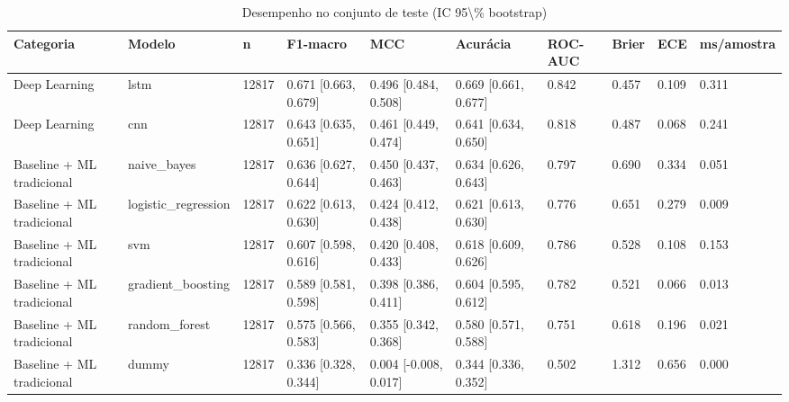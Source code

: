 \begin{table}[ht]
\centering
\caption{Desempenho no conjunto de teste (IC 95\textbackslash{}\% bootstrap)}
\label{tab:resultados}
\begin{tabular}{llllllllll}
\toprule
Categoria & Modelo & n & F1-macro & MCC & Acurácia & ROC-AUC & Brier & ECE & ms/amostra \\
\midrule
Deep Learning & lstm & 12817 & 0.671 [0.663, 0.679] & 0.496 [0.484, 0.508] & 0.669 [0.661, 0.677] & 0.842 & 0.457 & 0.109 & 0.311 \\
Deep Learning & cnn & 12817 & 0.643 [0.635, 0.651] & 0.461 [0.449, 0.474] & 0.641 [0.634, 0.650] & 0.818 & 0.487 & 0.068 & 0.241 \\
Baseline + ML tradicional & naive\_bayes & 12817 & 0.636 [0.627, 0.644] & 0.450 [0.437, 0.463] & 0.634 [0.626, 0.643] & 0.797 & 0.690 & 0.334 & 0.051 \\
Baseline + ML tradicional & logistic\_regression & 12817 & 0.622 [0.613, 0.630] & 0.424 [0.412, 0.438] & 0.621 [0.613, 0.630] & 0.776 & 0.651 & 0.279 & 0.009 \\
Baseline + ML tradicional & svm & 12817 & 0.607 [0.598, 0.616] & 0.420 [0.408, 0.433] & 0.618 [0.609, 0.626] & 0.786 & 0.528 & 0.108 & 0.153 \\
Baseline + ML tradicional & gradient\_boosting & 12817 & 0.589 [0.581, 0.598] & 0.398 [0.386, 0.411] & 0.604 [0.595, 0.612] & 0.782 & 0.521 & 0.066 & 0.013 \\
Baseline + ML tradicional & random\_forest & 12817 & 0.575 [0.566, 0.583] & 0.355 [0.342, 0.368] & 0.580 [0.571, 0.588] & 0.751 & 0.618 & 0.196 & 0.021 \\
Baseline + ML tradicional & dummy & 12817 & 0.336 [0.328, 0.344] & 0.004 [-0.008, 0.017] & 0.344 [0.336, 0.352] & 0.502 & 1.312 & 0.656 & 0.000 \\
\bottomrule
\end{tabular}
\end{table}
